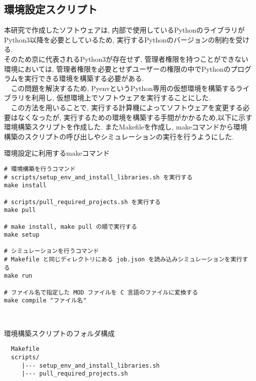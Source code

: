 \subsection{環境設定スクリプト}
本研究で作成したソフトウェアは, 内部で使用しているPythonのライブラリがPython3以降を必要としているため,
実行するPythonのバージョンの制約を受ける.\\
そのため京に代表されるPython3が存在せず, 管理者権限を持つことができない環境においては,
管理者権限を必要とせずユーザーの権限の中でPythonのプログラムを実行できる環境を構築する必要がある.\\
　この問題を解決するため, Pyenv\cite{pyenv-repo}というPython専用の仮想環境を構築するライブラリを利用し,
仮想環境上でソフトウェアを実行することにした.\\
　この方法を用いることで, 実行する計算機によってソフトウェアを変更する必要はなくなったが,
実行するための環境を構築する手間がかかるため,以下に示す環境構築スクリプトを作成した.
 またMakefileを作成し, makeコマンドから環境構築のスクリプトの呼び出しやシミュレーションの実行を行うようにした.\\

\begin{table}[htb]
  \caption {環境設定に利用するmakeコマンド}
{\footnotesize
\begin{framed}
\begin{verbatim}
# 環境構築を行うコマンド
# scripts/setup_env_and_install_libraries.sh を実行する
make install

# scripts/pull_required_projects.sh を実行する
make pull

# make install, make pull の順で実行する
make setup

# シミュレーションを行うコマンド
# Makefile と同じディレクトリにある job.json を読み込みシミュレーションを実行する
make run

# ファイル名で指定した MOD ファイルを C 言語のファイルに変換する
make compile "ファイル名"
\end{verbatim}
\end{framed}
}
\end{table}~\\

\begin{table}[htb]
  \caption {環境構築スクリプトのフォルダ構成}
{\footnotesize
\begin{framed}
\begin{verbatim}
  Makefile
  scripts/
     |--- setup_env_and_install_libraries.sh
     |--- pull_required_projects.sh
\end{verbatim}
\end{framed}
}
\end{table}~\\

